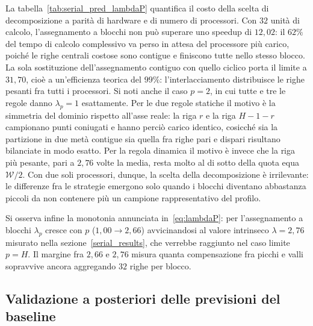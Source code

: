 La tabella~\ref{tab:serial_pred_lambdaP} quantifica il costo della scelta
di decomposizione a parità di hardware e di numero di processori.  Con
$32$ unità di calcolo, l'assegnamento a blocchi non può superare uno
speedup di $12{,}02$: il $62\%$ del tempo di calcolo complessivo va perso in
attesa del processore più carico, poiché le righe centrali costose sono contigue e finiscono
tutte nello stesso blocco.  La sola sostituzione dell'assegnamento
contiguo con quello ciclico porta il limite a $31{,}70$, cioè a
un'efficienza teorica del $99\%$: l'interlacciamento distribuisce le
righe pesanti fra tutti i processori.  Si noti anche il caso $p=2$, in
cui tutte e tre le regole danno $\lambda_p = 1$ esattamente.  Per le due
regole statiche il motivo è la simmetria del dominio rispetto all'asse
reale: la riga $r$ e la riga $H{-}1{-}r$ campionano punti coniugati e
hanno perciò carico identico, cosicché sia la partizione in due metà
contigue sia quella fra righe pari e dispari risultano bilanciate in modo
esatto.  Per la regola dinamica il motivo è invece che la riga più
pesante, pari a $2{,}76$ volte la media, resta molto al di sotto della
quota equa $\mathcal{W}/2$.  Con due soli processori, dunque, la scelta
della decomposizione è irrilevante: le differenze fra le strategie
emergono solo quando i blocchi diventano abbastanza piccoli da non
contenere più un campione rappresentativo del profilo.

Si osserva infine la monotonia annunciata in~\eqref{eq:lambdaP}: per
l'assegnamento a blocchi $\lambda_p$ cresce con $p$ ($1{,}00 \to 2{,}66$)
avvicinandosi al valore intrinseco $\lambda = 2{,}76$ misurato nella
sezione~\ref{serial_results}, che
verrebbe raggiunto nel caso limite $p = H$.  Il margine fra $2{,}66$ e
$2{,}76$ misura quanta compensazione fra picchi e valli
sopravvive ancora aggregando $32$ righe per blocco.




\subsection{Validazione a posteriori delle previsioni del baseline}
\label{sec:validazione-previsioni}

